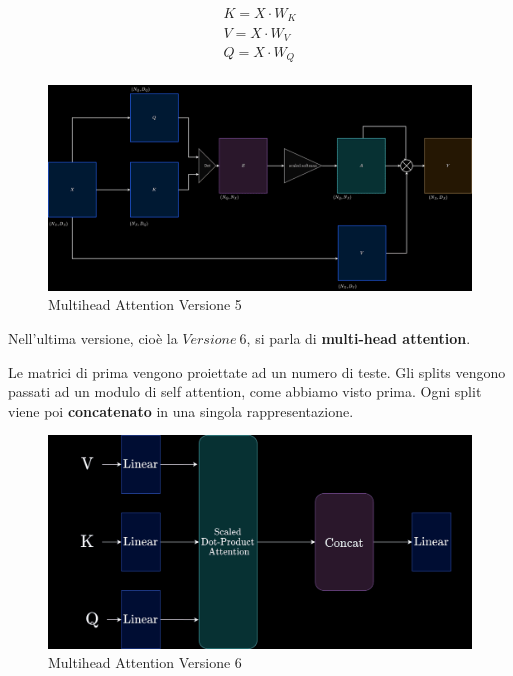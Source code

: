 \begin{equation}
    \begin{aligned}
        K = X \cdot W_K \\
        V = X \cdot W_V \\
        Q = X \cdot W_Q \\
    \end{aligned}
\end{equation}

\begin{figure}[H]
    \includegraphics[width=\textwidth]{images/evolution-Version-5.png}
    \caption{Multihead Attention Versione 5}
\end{figure}

Nell'ultima versione, cioè la $Versione \ 6$, si parla di \textbf{multi-head
    attention}.

Le matrici di prima vengono proiettate ad un numero di teste. Gli splits
vengono passati ad un modulo di self attention, come abbiamo visto prima. Ogni
split viene poi \textbf{concatenato} in una singola rappresentazione.

\begin{figure}[H]
    \includegraphics[width=\textwidth]{images/mha.png}
    \caption{Multihead Attention Versione 6}
\end{figure}

